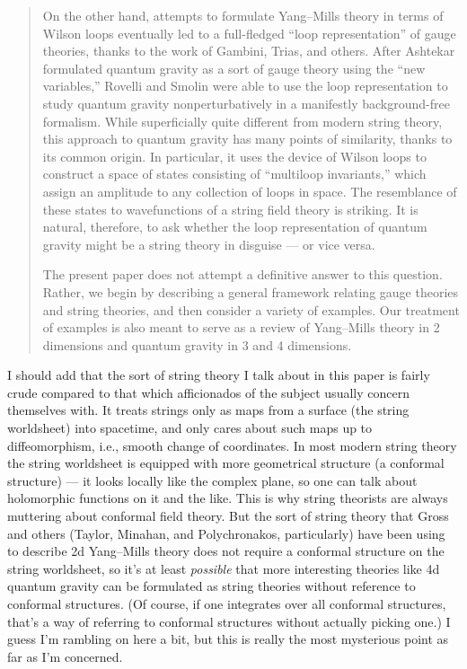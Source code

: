 \documentclass{article}
\begin{document}
\begin{quote}
On the other hand, attempts to formulate Yang--Mills theory in terms of
Wilson loops eventually led to a full-fledged ``loop representation'' of
gauge theories, thanks to the work of Gambini, Trias, and others. After
Ashtekar formulated quantum gravity as a sort of gauge theory using the
``new variables,'' Rovelli and Smolin were able to use the loop
representation to study quantum gravity nonperturbatively in a
manifestly background-free formalism. While superficially quite
different from modern string theory, this approach to quantum gravity
has many points of similarity, thanks to its common origin. In
particular, it uses the device of Wilson loops to construct a space of
states consisting of ``multiloop invariants,'' which assign an amplitude
to any collection of loops in space. The resemblance of these states to
wavefunctions of a string field theory is striking. It is natural,
therefore, to ask whether the loop representation of quantum gravity
might be a string theory in disguise --- or vice versa.

The present paper does not attempt a definitive answer to this question.
Rather, we begin by describing a general framework relating gauge
theories and string theories, and then consider a variety of examples.
Our treatment of examples is also meant to serve as a review of
Yang--Mills theory in 2 dimensions and quantum gravity in 3 and 4
dimensions.
\end{quote}

I should add that the sort of string theory I talk about in this paper
is fairly crude compared to that which afficionados of the subject
usually concern themselves with. It treats strings only as maps from a
surface (the string worldsheet) into spacetime, and only cares about
such maps up to diffeomorphism, i.e., smooth change of coordinates. In
most modern string theory the string worldsheet is equipped with more
geometrical structure (a conformal structure) --- it looks locally like
the complex plane, so one can talk about holomorphic functions on it and
the like. This is why string theorists are always muttering about
conformal field theory. But the sort of string theory that Gross and
others (Taylor, Minahan, and Polychronakos, particularly) have been
using to describe 2d Yang--Mills theory does not require a conformal
structure on the string worldsheet, so it's at least \emph{possible}
that more interesting theories like 4d quantum gravity can be formulated
as string theories without reference to conformal structures. (Of
course, if one integrates over all conformal structures, that's a way of
referring to conformal structures without actually picking one.) I guess
I'm rambling on here a bit, but this is really the most mysterious point
as far as I'm concerned.
\end{document}
